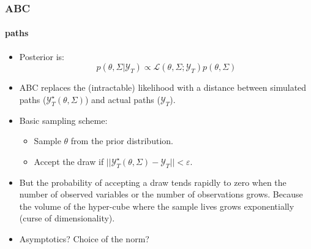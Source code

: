 \documentclass[10pt]{beamer}
\begin{document}
\begin{frame}
  \frametitle{ABC}
  \framesubtitle{paths}

  \begin{itemize}

  \item Posterior is:
    \[
      p(\theta,\Sigma|\mathcal Y_T) \propto \mathcal L (\theta,\Sigma; \mathcal Y_T) p(\theta,\Sigma)
    \]

    \bigskip
    
  \item ABC replaces the (intractable) likelihood with a distance between simulated paths ($\mathcal Y_T^\star(\theta,\Sigma)$) and actual paths ($\mathcal Y_T$).\newline

    \bigskip
    
  \item Basic sampling scheme:
    \begin{itemize}
    \item Sample $\theta$ from the prior distribution.
    \item Accept the draw if $||\mathcal Y_T^\star(\theta,\Sigma)-\mathcal Y_T||<\varepsilon$.
    \end{itemize}

    \bigskip

  \item But the probability of accepting a draw tends rapidly to zero
    when the number of observed variables or the number of
    observations grows. Because the volume of the hyper-cube where the
    sample lives grows exponentially (curse of dimensionality).

    \bigskip
    
  \item Asymptotics? Choice of the norm?
    
  \end{itemize}
\end{frame}
\end{document}
